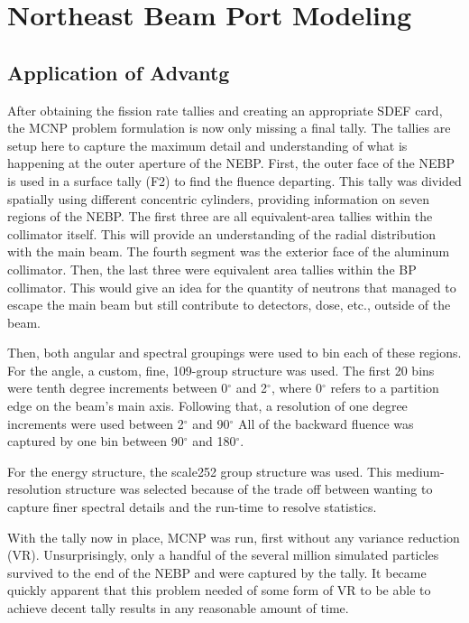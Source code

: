
\cleardoublepage


\chapter{Northeast Beam Port Modeling}


\section{Application of Advantg}

After obtaining the fission rate tallies and creating an appropriate SDEF card, the MCNP problem formulation is now only missing a final tally.
The tallies are setup here to capture the maximum detail and understanding of what is happening at the outer aperture of the NEBP.
First, the outer face of the NEBP is used in a surface tally (F2) to find the fluence departing.
This tally was divided spatially using different concentric cylinders, providing information on seven regions of the NEBP.
The first three are all equivalent-area tallies within the collimator itself.
This will provide an understanding of the radial distribution with the main beam.
The fourth segment was the exterior face of the aluminum collimator.
Then, the last three were equivalent area tallies within the BP collimator.
This would give an idea for the quantity of neutrons that managed to escape the main beam but still contribute to detectors, dose, etc., outside of the beam.

Then, both angular and spectral groupings were used to bin each of these regions.
For the angle, a custom, fine, 109-group structure was used.
The first 20 bins were tenth degree increments between 0$^{\circ}$ and 2$^{\circ}$, where 0$^{\circ}$ refers to a partition edge on the beam's main axis.
Following that, a resolution of one degree increments were used between 2$^{\circ}$ and 90$^{\circ}$
All of the backward fluence was captured by one bin between 90$^{\circ}$ and 180$^{\circ}$.

For the energy structure, the scale252 group structure was used.
This medium-resolution structure was selected because of the trade off between wanting to capture finer spectral details and the run-time to resolve statistics.

With the tally now in place, MCNP was run, first without any variance reduction (VR).
Unsurprisingly, only a handful of the several million simulated particles survived to the end of the NEBP and were captured by the tally.
It became quickly apparent that this problem needed of some form of VR to be able to achieve decent tally results in any reasonable amount of time.

